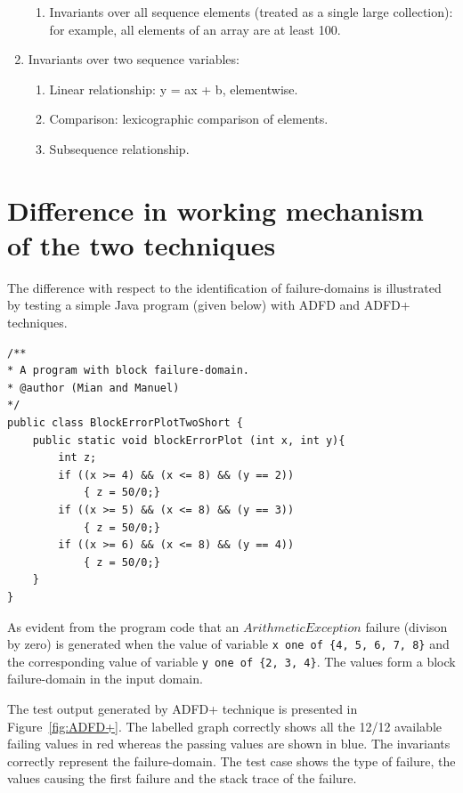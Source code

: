 \begin{enumerate}
\begin{enumerate}
	\item Invariants over all sequence elements (treated as a single large collection): for example, all elements of an array are at least 100.
	\end{enumerate}
\item Invariants over two sequence variables: 
	\begin{enumerate}
	\item Linear relationship: y = ax + b, elementwise. 
	\item Comparison: lexicographic comparison of elements. 
	\item Subsequence relationship.
	\end{enumerate}
\end{enumerate}








\section{Difference in working mechanism of the two techniques}
The difference with respect to the identification of failure-domains is illustrated by testing a simple Java program (given below) with ADFD and ADFD+ techniques. 
\bigskip
\begin{lstlisting}
/** 
* A program with block failure-domain.
* @author (Mian and Manuel)
*/
public class BlockErrorPlotTwoShort {
	public static void blockErrorPlot (int x, int y){
		int z;
		if ((x >= 4) && (x <= 8) && (y == 2))
			{ z = 50/0;}
		if ((x >= 5) && (x <= 8) && (y == 3))
			{ z = 50/0;}
		if ((x >= 6) && (x <= 8) && (y == 4))
			{ z = 50/0;}
	}
}
\end{lstlisting}
\bigskip


As evident from the program code that an $ArithmeticException$ failure (divison by zero) is generated when the value of variable \verb+x one of {4, 5, 6, 7, 8}+ and the corresponding value of variable \verb+y one of {2, 3, 4}+. The values form a block failure-domain in the input domain.

The test output generated by ADFD+ technique is presented in Figure~\ref{fig:ADFD+}. The labelled graph correctly shows all the 12/12 available failing values in red whereas the passing values are shown in blue. The invariants correctly represent the failure-domain. The test case shows the type of failure, the values causing the first failure and the stack trace of the failure.

